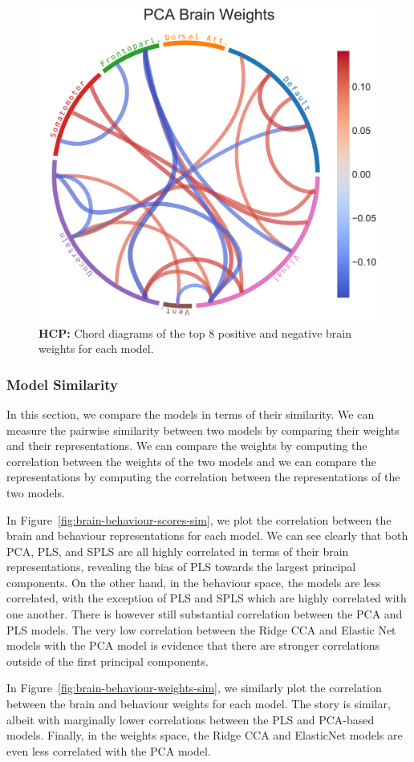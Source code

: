 \begin{figure}[h]
    \includegraphics[width=0.49\linewidth]{figures/hcp/PCA brain weights}
    \caption{\textbf{HCP:} Chord diagrams of the top 8 positive and negative brain \gls{weights} for each model.}\label{fig:chord_weights}
\end{figure}

\subsubsection{Model Similarity}

In this section, we compare the models in terms of their similarity.
We can measure the pairwise similarity between two models by comparing their \gls{weights} and their \gls{representations}.
We can compare the \gls{weights} by computing the correlation between the \gls{weights} of the two models and we can compare the \gls{representations} by computing the correlation between the \gls{representations} of the two models.

In Figure~\ref{fig:brain-behaviour-scores-sim}, we plot the correlation between the brain and behaviour \gls{representations} for each model. We can see clearly that both PCA, PLS, and SPLS are all highly correlated in terms of their brain representations, revealing the bias of PLS towards the largest principal components.
On the other hand, in the behaviour space, the models are less correlated, with the exception of PLS and SPLS which are highly correlated with one another. There is however still substantial correlation between the PCA and PLS models.
The very low correlation between the Ridge CCA and Elastic Net models with the PCA model is evidence that there are stronger correlations outside of the first principal components.

In Figure~\ref{fig:brain-behaviour-weights-sim}, we similarly plot the correlation between the brain and behaviour \gls{weights} for each model. The story is similar, albeit with marginally lower correlations between the PLS and PCA-based models. Finally, in the weights space, the Ridge CCA and ElasticNet models are even less correlated with the PCA model.

